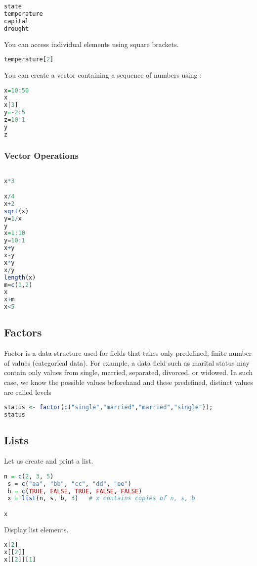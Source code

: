 \documentclass["../Applied_probabillity _and_statistics_lab_KTU.tex"]{subfiles}
\begin{document}
\begin{lstlisting}[language=R]
state
temperature
capital
drought

\end{lstlisting}
 

You can access individual elements using square brackets.
\begin{lstlisting}[language=R]
 temperature[2]
\end{lstlisting}



You can create a vector containing a sequence of numbers using :

\begin{lstlisting}[language=R]
 x=10:50
x
x[3]
y=-2:5
z=10:1
y
z
\end{lstlisting}

\subsubsection{Vector Operations}

\begin{lstlisting}[language=R]

x*3 

x/4
x+2
sqrt(x)
y=1/x
y
x=1:10
y=10:1
x+y
x-y
x*y
x/y
length(x)
m=c(1,2)
x
x+m
x<5
\end{lstlisting}

\subsection{Factors}
Factor is a data structure used for fields that takes only predefined, finite number of values (categorical data). For example, a data field such as marital status may contain only values from single, married, separated, divorced, or widowed. In such case, we know the possible values beforehand and these predefined, distinct values are called levels
\begin{lstlisting}[language=R]
status <- factor(c("single","married","married","single"));
status
\end{lstlisting}

\subsection{Lists}
Let us create and print  a list.
\begin{lstlisting}[language=R]
 n = c(2, 3, 5) 
 s = c("aa", "bb", "cc", "dd", "ee") 
 b = c(TRUE, FALSE, TRUE, FALSE, FALSE) 
 x = list(n, s, b, 3)   # x contains copies of n, s, b

x
\end{lstlisting}
Display list elements.
\begin{lstlisting}[language=R]
x[2]
x[[2]]
x[[2]][1]
\end{lstlisting}
\end{document}
